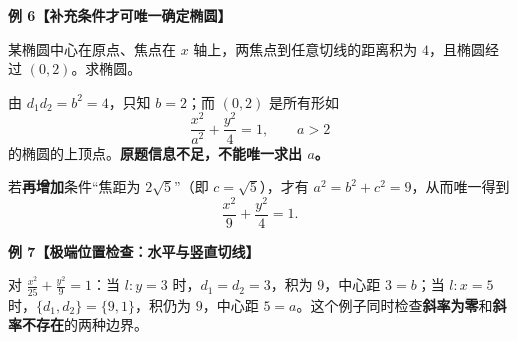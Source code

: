 \begin{examplebox}
\medskip
\textbf{例 6【补充条件才可唯一确定椭圆】}

某椭圆中心在原点、焦点在 $x$ 轴上，两焦点到任意切线的距离积为 $4$，且椭圆经过 $(0,2)$。求椭圆。

由 $d_1d_2=b^2=4$，只知 $b=2$；而 $(0,2)$ 是所有形如
\[
\frac{x^2}{a^2}+\frac{y^2}{4}=1,\qquad a>2
\]
的椭圆的上顶点。\textbf{原题信息不足，不能唯一求出 $a$。}

若\textbf{再增加}条件“焦距为 $2\sqrt5$”（即 $c=\sqrt5$），才有 $a^2=b^2+c^2=9$，从而唯一得到
\[
\boxed{\frac{x^2}{9}+\frac{y^2}{4}=1}.
\]

\medskip
\textbf{例 7【极端位置检查：水平与竖直切线】}

对 $\frac{x^2}{25}+\frac{y^2}{9}=1$：当 $l:y=3$ 时，$d_1=d_2=3$，积为 $9$，中心距 $3=b$；当 $l:x=5$ 时，$\{d_1,d_2\}=\{9,1\}$，积仍为 $9$，中心距 $5=a$。这个例子同时检查\textbf{斜率为零}和\textbf{斜率不存在}的两种边界。
\end{examplebox}
